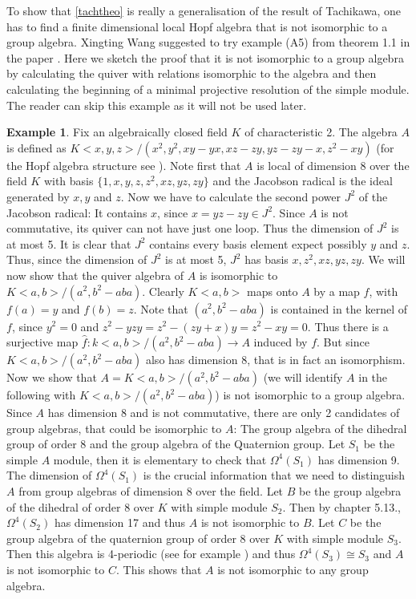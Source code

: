 \documentclass[a4paper]{amsart}
\theoremstyle{definition}
\newtheorem{example}[theorem]{Example}
\theoremstyle{remark}
\numberwithin{equation}{theorem}
\begin{document}
To show that \ref{tachtheo} is really a generalisation of the result of Tachikawa, one has to find a finite dimensional local Hopf algebra that is not isomorphic to a group algebra. Xingting Wang suggested to try example (A5) from theorem 1.1 in the paper \cite{NWW}. Here we sketch the proof that it is not isomorphic to a group algebra by calculating the quiver with relations isomorphic to the algebra and then calculating the beginning of a minimal projective resolution of the simple module. The reader can skip this example as it will not be used later.
\begin{example}\label{hopfexample}
Fix an algebraically closed field $K$ of characteristic 2. The algebra $A$ is defined as $K<x,y,z>/(x^2,y^2,xy-yx,xz-zy,yz-zy-x,z^2-xy)$ (for the Hopf algebra structure see \cite{NWW}). 
Note first that $A$ is local of dimension 8 over the field $K$ with basis $\{1,x,y,z,z^2,xz,yz,zy\}$ and the Jacobson radical is the ideal generated by $x,y$ and $z$. Now we have to calculate the second power $J^2$ of the Jacobson radical: It contains $x$, since $x=yz-zy \in J^2$. Since $A$ is not commutative, its quiver can not have just one loop. Thus the dimension of $J^2$ is at most 5. It is clear that $J^2$ contains every basis element expect possibly $y$ and $z$. Thus, since the dimension of $J^2$ is at most 5, $J^2$ has basis $x,z^2,xz,yz,zy$. We will now show that the quiver algebra of $A$ is isomorphic to $K<a,b>/(a^2,b^2-aba)$. Clearly $K<a,b>$ maps onto $A$ by a map $f$, with $f(a)=y$ and $f(b)=z$. Note that $(a^2,b^2-aba)$ is contained in the kernel of $f$, since $y^2=0$ and $z^2-yzy=z^2-(zy+x)y=z^2-xy=0$. Thus there is a surjective map $\hat{f}:k<a,b>/(a^2,b^2-aba) \rightarrow A$ induced by $f$. But since $K<a,b>/(a^2,b^2-aba)$ also has dimension 8, that is in fact an isomorphism. \newline
Now we show that $A=K<a,b>/(a^2,b^2-aba)$ (we will identify $A$ in the following with $K<a,b>/(a^2,b^2-aba)$)  is not isomorphic to a group algebra. Since $A$ has dimension 8 and is not commutative, there are only 2 candidates of group algebras, that could be isomorphic to $A$: The group algebra of the dihedral group of order 8 and the group algebra of the Quaternion group.
Let $S_1$ be the simple $A$ module, then it is elementary to check that $\Omega^{4}(S_1)$ has dimension 9.
The dimension of $\Omega^{4}(S_1)$ is the crucial information that we need to distinguish $A$ from group algebras of dimension 8 over the field. Let $B$ be the group algebra of the dihedral of order 8 over $K$ with simple module $S_2$. Then by \cite{Ben2} chapter 5.13., $\Omega^{4}(S_2)$ has dimension 17 and thus $A$ is not isomorphic to $B$. Let $C$ be the group algebra of the quaternion group of order 8 over $K$ with simple module $S_3$. Then this algebra is 4-periodic (see for example \cite{Erd}) and thus $\Omega^{4}(S_3) \cong S_3$ and $A$ is not isomorphic to $C$. This shows that $A$ is not isomorphic to any group algebra.


\end{example}
\end{document}
